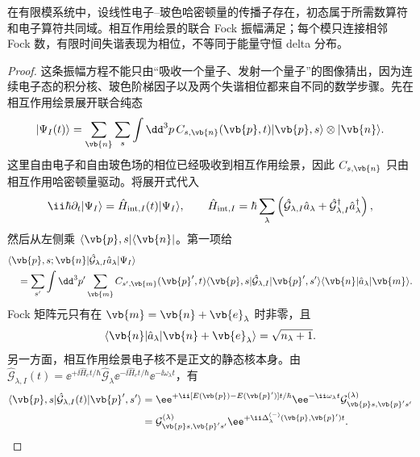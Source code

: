 \begin{proposition}[线性玻色耦合的振幅邻接层级]
在有限模系统中，设线性电子--玻色哈密顿量的传播子存在，初态属于所需数算符和电子算符共同域。相互作用绘景的联合 Fock 振幅满足；每个模只连接相邻 Fock 数，有限时间失谐表现为相位，不等同于能量守恒 delta 分布。
\end{proposition}
\begin{proof}
这条振幅方程不能只由“吸收一个量子、发射一个量子”的图像猜出，因为连续电子态的积分核、玻色阶梯因子以及两个失谐相位都来自不同的数学步骤。先在相互作用绘景展开联合纯态
\begin{equation*}
 |\Psi_I(t)\rangle
 =\sum_{\vb{n}}\sum_s\int\dd^3p\,
 C_{s,\vb{n}}(\vb{p},t)
 |\vb{p},s\rangle\otimes|\vb{n}\rangle .
\end{equation*}
这里自由电子和自由玻色场的相位已经吸收到相互作用绘景，因此 $C_{s,\vb{n}}$ 只由相互作用哈密顿量驱动。将展开式代入
\begin{equation*}
 \ii\hbar\partial_t|\Psi_I\rangle
 =\hat H_{{\rm int},I}(t)|\Psi_I\rangle,
 \qquad
 \hat H_{{\rm int},I}
 =\hbar\sum_\lambda
 \left(\hat{\mathcal G}_{\lambda,I}\hat a_\lambda
 +\hat{\mathcal G}_{\lambda,I}^\dagger\hat a_\lambda^\dagger\right),
\end{equation*}
然后从左侧乘 $\langle\vb{p},s|\langle\vb{n}|$。第一项给
\begin{align*}
 &\langle\vb{p},s;\vb{n}|
 \hat{\mathcal G}_{\lambda,I}\hat a_\lambda
 |\Psi_I\rangle\\
 &\quad=\sum_{s'}\int\dd^3p'\sum_{\vb{m}}
 C_{s',\vb{m}}(\vb{p}',t)
 \langle\vb{p},s|\hat{\mathcal G}_{\lambda,I}|\vb{p}',s'\rangle
 \langle\vb{n}|\hat a_\lambda|\vb{m}\rangle .
\end{align*}
Fock 矩阵元只有在 $\vb{m}=\vb{n}+\vb{e}_\lambda$ 时非零，且
\begin{equation*}
 \langle\vb{n}|\hat a_\lambda|
 \vb{n}+\vb{e}_\lambda\rangle
 =\sqrt{n_\lambda+1}.
\end{equation*}
另一方面，相互作用绘景电子核不是正文的静态核本身。由
$\hat{\mathcal G}_{\lambda,I}(t)
 =\ee^{+\ii\hat H_e t/\hbar}\hat{\mathcal G}_\lambda
 \ee^{-\ii\hat H_e t/\hbar}\ee^{-\ii\omega_\lambda t}$，有
\begin{align*}
 \langle\vb{p},s|\hat{\mathcal G}_{\lambda,I}(t)|\vb{p}',s'\rangle
 &=\ee^{+\ii[E(\vb{p})-E(\vb{p}')]t/\hbar}
 \ee^{-\ii\omega_\lambda t}
 \mathcal G^{(\lambda)}_{\vb{p} s,\vb{p}'s'}\\
 &=\mathcal G^{(\lambda)}_{\vb{p} s,\vb{p}'s'}
 \ee^{+\ii\Delta_\lambda^{(-)}(\vb{p},\vb{p}')t}.

\end{align*}
\end{proof}

